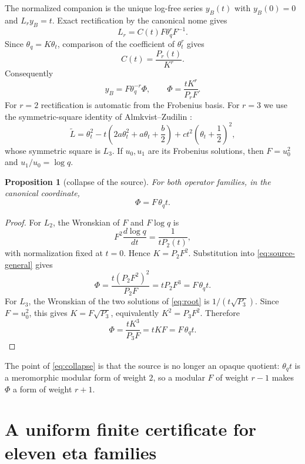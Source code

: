 \documentclass[11pt]{article}
\newtheorem{proposition}[theorem]{Proposition}
\theoremstyle{remark}
\newcommand{\tht}{\theta_t}
\newcommand{\thq}{\theta_q}
\begin{document}
The normalized companion is the unique log-free series $y_B(t)$ with
$y_B(0)=0$ and $L_r y_B=t$.  Exact rectification by the canonical nome gives
\[
 L_r=C(t)F\thq^rF^{-1}.
\]
Since $\thq=K\tht$, comparison of the coefficient of $\tht^r$ gives
\begin{equation}
 C(t)=\frac{P_r(t)}{K^r}.
 \label{eq:C}
\end{equation}
Consequently
\begin{equation}
 y_B=F\thq^{-r}\Phi,
 \qquad
 \Phi=\frac{tK^r}{P_rF}.
 \label{eq:source-general}
\end{equation}
For $r=2$ rectification is automatic from the Frobenius basis.  For $r=3$
we use the symmetric-square identity of Almkvist--Zudilin \cite[Prop.~9]{AZ}:
\begin{equation}
 \widetilde L
 =\tht^2-t\left(2a\tht^2+a\tht+\frac b2\right)
       +ct^2\left(\tht+\frac12\right)^2,
 \label{eq:root}
\end{equation}
whose symmetric square is $L_3$.  If $u_0,u_1$ are its Frobenius solutions,
then $F=u_0^2$ and $u_1/u_0=\log q$.

\begin{proposition}[collapse of the source]\label{prop:collapse}
For both operator families, in the canonical coordinate,
\begin{equation}
 \boxed{\ \Phi=F\,\thq t.\ }
 \label{eq:collapse}
\end{equation}
\end{proposition}

\begin{proof}
For $L_2$, the Wronskian of $F$ and $F\log q$ is
\[
 F^2\frac{d\log q}{dt}=\frac1{tP_2(t)},
\]
with normalization fixed at $t=0$.  Hence $K=P_2F^2$.  Substitution into
\eqref{eq:source-general} gives
\[
 \Phi=\frac{t(P_2F^2)^2}{P_2F}=tP_2F^3
      =F\,\thq t.
\]
For $L_3$, the Wronskian of the two solutions of \eqref{eq:root} is
$1/(t\sqrt{P_3})$.  Since $F=u_0^2$, this gives
$K=F\sqrt{P_3}$, equivalently $K^2=P_3F^2$.  Therefore
\[
 \Phi=\frac{tK^3}{P_3F}=tKF=F\,\thq t.
\]
\end{proof}

The point of \eqref{eq:collapse} is that the source is no longer an opaque
quotient: $\thq t$ is a meromorphic modular form of weight $2$, so a modular
$F$ of weight $r-1$ makes $\Phi$ a form of weight $r+1$.

\section{A uniform finite certificate for eleven eta families}
\end{document}
